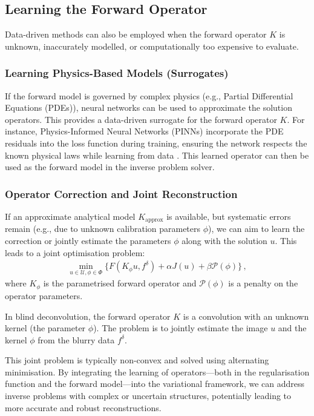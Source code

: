 \subsection{Learning the Forward Operator}
Data-driven methods can also be employed when the forward operator $K$ is unknown, inaccurately modelled, or computationally too expensive to evaluate.

\subsubsection{Learning Physics-Based Models (Surrogates)}
If the forward model is governed by complex physics (e.g., Partial Differential Equations (PDEs)), neural networks can be used to approximate the solution operators. This provides a data-driven surrogate for the forward operator $K$. For instance, Physics-Informed Neural Networks (PINNs) incorporate the PDE residuals into the loss function during training, ensuring the network respects the known physical laws while learning from data \cite{raissi2019physics}. This learned operator can then be used as the forward model in the inverse problem solver.

\subsubsection{Operator Correction and Joint Reconstruction}
If an approximate analytical model $K_{\text{approx}}$ is available, but systematic errors remain (e.g., due to unknown calibration parameters $\phi$), we can aim to learn the correction or jointly estimate the parameters $\phi$ along with the solution $u$. This leads to a joint optimisation problem:
\begin{align*}
    \min_{u \in \mathcal{U}, \phi \in \Phi} \{ F(K_\phi u, f^\delta) + \alpha J(u) + \beta \mathcal{P}(\phi) \} \, ,
\end{align*}
where $K_\phi$ is the parametrised forward operator and $\mathcal{P}(\phi)$ is a penalty on the operator parameters.

\begin{exm}\normalfont
In blind deconvolution, the forward operator $K$ is a convolution with an unknown kernel (the parameter $\phi$). The problem is to jointly estimate the image $u$ and the kernel $\phi$ from the blurry data $f^\delta$.
\end{exm}

This joint problem is typically non-convex and solved using alternating minimisation. By integrating the learning of operators—both in the regularisation function and the forward model—into the variational framework, we can address inverse problems with complex or uncertain structures, potentially leading to more accurate and robust reconstructions.